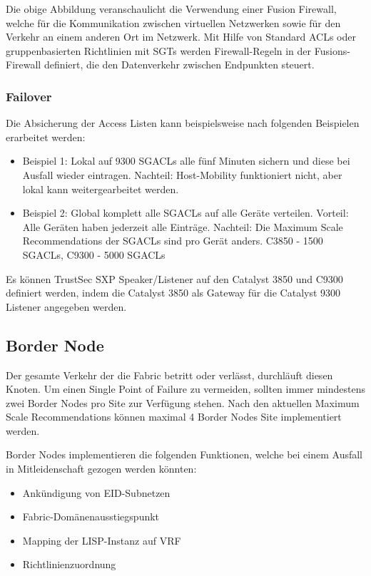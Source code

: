 Die obige Abbildung veranschaulicht die Verwendung einer Fusion Firewall, welche für die Kommunikation zwischen virtuellen Netzwerken sowie für den Verkehr an einem anderen Ort im Netzwerk. Mit Hilfe von Standard ACLs oder gruppenbasierten Richtlinien mit SGTs werden Firewall-Regeln in der Fusions-Firewall definiert, die den Datenverkehr zwischen Endpunkten steuert.

\subsubsection{Failover}
Die Absicherung der Access Listen kann beispielsweise nach folgenden Beispielen erarbeitet werden:

\begin{itemize}
	\item Beispiel 1: Lokal auf 9300 SGACLs alle fünf Minuten sichern und diese bei Ausfall wieder eintragen. Nachteil: Host-Mobility funktioniert nicht, aber lokal kann weitergearbeitet werden.
	\item Beispiel 2: Global komplett alle SGACLs auf alle Geräte verteilen. Vorteil: Alle Geräten haben jederzeit alle Einträge. Nachteil: Die Maximum Scale Recommendations der SGACLs sind pro Gerät anders. C3850 - 1500 SGACLs, C9300 - 5000 SGACLs
\end{itemize}

Es können TrustSec SXP Speaker/Listener auf den Catalyst 3850 und C9300 definiert werden, indem die Catalyst 3850 als Gateway für die Catalyst 9300 Listener angegeben werden.

\subsection{Border Node}
Der gesamte Verkehr der die Fabric betritt oder verlässt, durchläuft diesen Knoten. Um einen Single Point of Failure zu vermeiden, sollten immer mindestens zwei Border Nodes pro Site zur Verfügung stehen. Nach den aktuellen Maximum Scale Recommendations können maximal 4 Border Nodes Site implementiert werden.

Border Nodes implementieren die folgenden Funktionen, welche bei einem Ausfall in Mitleidenschaft gezogen werden könnten\cite{sda-designguide-sept2018}:
\begin{itemize}
	\item Ankündigung von EID-Subnetzen
	\item Fabric-Domänenausstiegspunkt
	\item Mapping der LISP-Instanz auf VRF
	\item Richtlinienzuordnung
\end{itemize}

